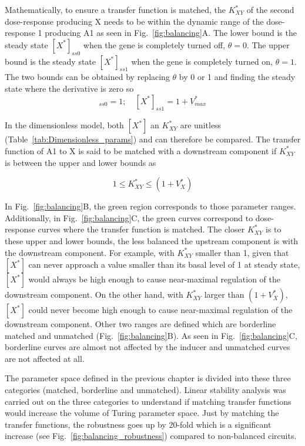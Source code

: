 Mathematically, to ensure a transfer function is matched,
the $K^*_{XY}$ of the second dose-response producing X needs
to be within the dynamic range of the dose-response 1 producing A1 as seen in Fig.~\ref{fig:balancing}A.
The lower bound is the steady state $[X^*]_{ss0}$ when the gene is completely turned off, $\theta=0$.
The upper bound is the steady state $[X^*]_{ss1}$ when the gene is completely turned on, $\theta=1$.
The two bounds can be obtained
by replacing $\theta$ by 0 or 1 and finding the steady state where the derivative is zero so
\begin{equation}
    [X^*]_{ss0}=1; \quad [X^*]_{ss1}=1+V^*_{max}
    \label{1toVmax}
\end{equation}


In the dimensionless model,
both $[X^*]$ an $K^*_{XY}$ are unitless (Table~\ref{tab:Dimensionless_params}) and can therefore be compared.
The transfer function of A1 to X is said
to be matched with a downstream component if $K^*_{XY}$ is between the upper and lower bounds as

\begin{equation}
    1 \leq K^*_{XY} \leq (1+V^*_{X})
\end{equation}

In Fig.~\ref{fig:balancing}B, the green region corresponds to those parameter ranges.
Additionally, in Fig.~\ref{fig:balancing}C,
the green curves correspond to dose-response curves where the transfer function is matched.
The closer $K^*_{XY}$ is to these upper and lower bounds,
the less balanced the upstream component is with the downstream component.
For example, with $K^*_{XY}$ smaller than 1,
given that $[X^*]$ can never approach a value smaller than its basal level of 1 at steady state, $[X^*]$
would always be high enough to cause near-maximal regulation of the downstream component.
On the other hand, with $K^*_{XY}$ larger than $(1+V^*_{X})$, $[X^*]$
could never become high enough to cause near-maximal regulation of the downstream component.
Other two ranges are defined which are borderline matched and unmatched (Fig.~\ref{fig:balancing}B).
As seen in Fig.~\ref{fig:balancing}C,
borderline curves are almost not affected by the inducer and unmatched curves are not affected at all.

The parameter space defined in the previous chapter is divided into these three categories
(matched, borderline and unmatched).
Linear stability analysis was carried out on the three categories
to understand if matching transfer functions would increase the volume of Turing parameter space.
Just by matching the transfer functions,
the robustness goes up by 20-fold which is a significant increase
(see Fig.~\ref{fig:balancing_robustness}) compared to non-balanced circuits.


